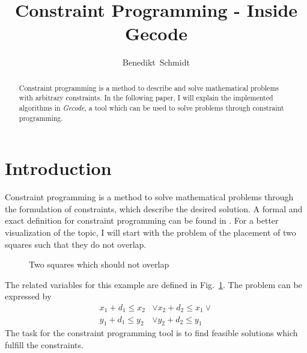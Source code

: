 \documentclass[10pt,
               a4paper,
               journal,
               ]{IEEEtran}
\makeatletter
\def\markboth#1#2{\def\leftmark{\@IEEEcompsoconly{\sffamily}\MakeUppercase{\protect#1}}%
\def\rightmark{\@IEEEcompsoconly{\sffamily}\MakeUppercase{\protect#2}}}
\newcommand{\reffig}[1]{{Fig.~\ref{#1}}}
\makeatother
\begin{document}
	\title{Constraint Programming - Inside Gecode}
	\author{Benedikt~Schmidt}
	\markboth{Advanced Seminar for Security in Information Technology, Summer Term 2014}%
	{Benedikt Schmidt: Constraint Programming - Inside \emph{Gecode}}	
	\maketitle	
	
	\begin{abstract}	
		Constraint programming is a method to describe and solve mathematical problems with arbitrary constraints. In the following paper, I will explain the implemented algorithms in \emph{Gecode}, a tool which can be used to solve problems through constraint programming.
	\end{abstract}
	
	\section{Introduction}
	Constraint programming is a method to solve mathematical problems through the formulation of constraints, which describe the desired solution. A formal and exact definition for constraint programming can be found in \cite[p.~16]{handbookCP}. For a better visualization of the topic, I will start with the problem of the placement of two squares such that they do not overlap.	
	
	\begin{figure}
		\center
		\caption{Two squares which should not overlap}
		\label{fig:squares}
	\end{figure}
	
	The related variables for this example are defined in \reffig{fig:squares}. The problem can be expressed by \cite[p. 101]{programmingGecode}
	\begin{equation}
	\begin{split}
		x_1 + d_1 \le x_2 & \lor x_2 + d_2 \le x_1 \lor \\
		y_1 + d_1 \le y_2 & \lor y_2 + d_2 \le y_1
	\end{split}
	\label{eq:squares}
	\end{equation}
	The task for the constraint programming tool is to find feasible solutions which fulfill the constraints.
	
\end{document}
